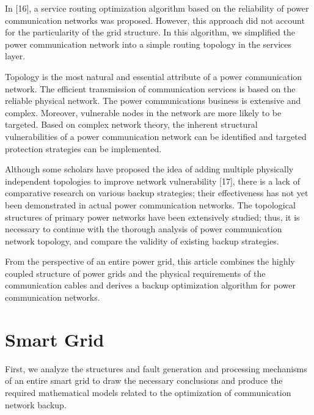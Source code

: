 \documentclass[AMA,STIX1COL]{WileyNJD-v2}
\begin{document}
\par In [16], a service routing optimization algorithm based on the reliability of power communication networks was proposed. However, this approach did not account for the particularity of the grid structure. In this algorithm, we simplified the power communication network into a simple routing topology in the services layer.

\par Topology is the most natural and essential attribute of a power communication network. The efficient transmission of communication services is based on the reliable physical network. The power communications business is extensive and complex. Moreover, vulnerable nodes in the network are more likely to be targeted. Based on complex network theory, the inherent structural vulnerabilities of a power communication network can be identified and targeted protection strategies can be implemented.

\par Although some scholars have proposed the idea of adding multiple physically independent topologies to improve network vulnerability [17], there is a lack of comparative research on various backup strategies; their effectiveness has not yet been demonstrated in actual power communication networks. The topological structures of primary power networks have been extensively studied; thus, it is necessary to continue with the thorough analysis of power communication network topology, and compare the validity of existing backup strategies.

\par From the perspective of an entire power grid, this article combines the highly coupled structure of power grids and the physical requirements of the communication cables and derives a backup optimization algorithm for power communication networks.



\section{Smart Grid}
\par First, we analyze the structures and fault generation and processing mechanisms of an entire smart grid to draw the necessary conclusions and produce the required mathematical models related to the optimization of communication network backup.
\end{document}
